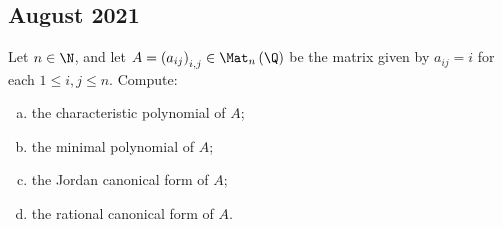\documentclass[10pt]{mypackage}
\begin{document}
\subsection{August 2021}%
\begin{problem}[Problem 1]
  Let $n\in \N$, and let $A = \left( a_{ij} \right)_{i,j}\in \Mat_n\left( \Q \right)$ be the matrix given by $a_{ij} = i$ for each $1\leq i,j\leq n$. Compute:
  \begin{enumerate}[(a)]
    \item the characteristic polynomial of $A$;
    \item the minimal polynomial of $A$;
    \item the Jordan canonical form of $A$;
    \item the rational canonical form of $A$.
  \end{enumerate}
\end{problem}
\end{document}
